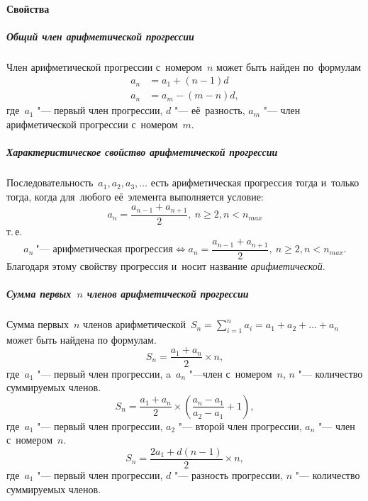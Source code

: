 \documentclass[]{scrartcl}
\begin{document}
\paragraph{Свойства}
\subparagraph{Общий член арифметической прогрессии}
Член арифметической прогрессии с~номером~${\textstyle n}$ может быть найден по~формулам
\begin{equation}\label{eq:arithmetic-progression-4}
	\begin{aligned}
	a_n&=a_1+(n-1)d\\
	a_n&=a_{m}-(m-n)d, 
	\end{aligned}
\end{equation}
где~${\textstyle a_{1}}$ "--- первый член прогрессии, ${\textstyle d}$ "--- её~разность, ${\textstyle a_{m}}$ "--- член арифметической прогрессии с~номером~${\textstyle m}$.

\subparagraph{Характеристическое свойство арифметической прогрессии}
Последовательность~${\textstyle a_{1},a_{2},a_{3},\ldots}$ есть арифметическая прогрессия тогда и~только тогда, когда для~любого её~элемента выполняется условие:
\begin{equation}\label{eq:arithmetic-progression-5}
a_{n}={\frac {a_{n-1}+a_{n+1}}{2}},\ n \geq 2, n < n_{max}
\end{equation}
т.\,е.
\begin{equation}\label{eq:arithmetic-progression-6}
a_n\ \text{"--- арифметическая прогрессия} \Leftrightarrow a_{n}={\frac {a_{n-1}+a_{n+1}}{2}},\ n \geq 2, n < n_{max}.
\end{equation}
Благодаря этому свойству прогрессия и~носит название \emph{арифметической}.
\subparagraph{Сумма первых~${\textstyle n}$ членов арифметической прогрессии}
Сумма первых~${\textstyle n}$ членов арифметической~${\displaystyle S_{n}=\sum _{i=1}^{n}a_{i}=a_{1}+a_{2}+\ldots +a_{n}}$ может быть найдена по формулам.
\begin{equation}\label{eq:arithmetic-progression-7}
S_n=\frac{a_1+a_n}{2} \times n, 
\end{equation} 
где~${\textstyle a_{1}}$ "--- первый член прогрессии, a~${\textstyle a_{n}}$ "---член с~номером~${\textstyle n}$, ${\textstyle n}$ "--- количество суммируемых членов.
\begin{equation}\label{eq:arithmetic-progression-8}
S_{n}=\frac{a_{1}+a_{n}}{2}\times ({\frac {a_{n}-a_{1}}{a_{2}-a_{1}}}+1),
\end{equation}
где~${\textstyle a_{1}}$ "--- первый член прогрессии, ${\textstyle a_{2}}$ "--- второй член прогрессии, ${\textstyle a_{n}}$ "--- член с~номером~${\textstyle n}$.
\begin{equation}\label{eq:arithmetic-progression-9}
S_n=\frac{2a_1+d(n-1)}{2} \times n,
\end{equation}
где~${\textstyle a_{1}}$ "--- первый член прогрессии, ${\textstyle d}$ "--- разность прогрессии, ${\textstyle n}$ "--- количество суммируемых членов.
\end{document}
